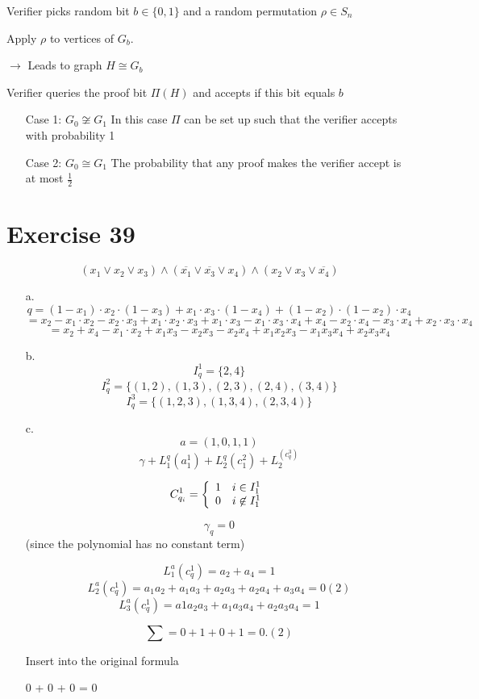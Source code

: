 \documentclass[11pt]{article}
\theoremstyle{definition}
\theoremstyle{definition}
\begin{document}
Verifier picks random bit $ b \in \{0, 1\} $ and a random permutation $ \rho \in S_n $ \newline

Apply $ \rho $ to vertices of $ G_b $.

$ \rightarrow $ Leads to graph $ H \cong G_b $

Verifier queries the proof bit $ \Pi(H) $ and accepts if this bit equals $ b $

\begin{enumerate}
\item[Case 1:] $ G_0 \not \cong G_1 $ \newline
	In this case $ \Pi $ can be set up such that the verifier accepts with probability 1
\item[Case 2:] $ G_0 \cong G_1 $ \newline
	The probability that any proof makes the verifier accept is at most $ \frac{1}{2} $
\end{enumerate}

\section*{Exercise 39}

\[ (x_1 \vee x_2 \vee x_3) \wedge (\overline{x_1} \vee \overline{x_3} \vee x_4) \wedge (x_2 \vee x_3 \vee \overline{x_4}) \]

\begin{enumerate}
\item[a.] \[ q = (1 - x_1) \cdot x_2 \cdot (1 - x_3) + x_1 \cdot x_3 \cdot (1 - x_4) + (1 - x_2) \cdot (1 - x_2) \cdot x_4 \]
	\[ = x_2 - x_1 \cdot x_2 - x_2 \cdot x_3 + x_1  \cdot x_2 \cdot x_3 + x_1 \cdot x_3 - x_1 \cdot x_3 \cdot x_4 + x_4 - x_2 \cdot x_4 - x_3 \cdot x_4 + x_2 \cdot x_3 \cdot x_4\]
	\[ = x_2 + x_4 - x_1 \cdot x_2 + x_1 x_3 - x_2 x_3 - x_2 x_4 + x_1 x_2 x_3 - x_1 x_3 x_4 + x_2 x_3 x_4 \]
\item[b.] \[ I_q^1 = \{2, 4\} \]
 \[ I_q^2 = \{(1,2), (1, 3), (2, 3), (2, 4), (3, 4)\} \]
  \[ I_q^3 = \{(1, 2, 3), (1, 3, 4), (2, 3, 4)\} \]
\item[c.] \[ a = (1, 0, 1, 1) \]
	\[ \gamma + L_1^q(a_1^1) + L_2^q(c_1^2) + L_2^(c_q^3) \]
	
	\[ C_{q_i}^1 = \left\{ \begin{array}{c l}1 & i \in I_1^1 \\ 0 & i \not \in I_1^1 \end{array} \right. \]
	
	\[ \gamma_q = 0 \]
	(since the polynomial has no constant term)
	
	\[ L_1^a (c_q^1) = a_2 + a_4 = 1 \]
	\[ L_2^a (c_q^1) = a_1 a_2 + a_1 a_3 + a_2 a_3 + a_2 a_4 + a_3 a_4 = 0 (2) \]
	\[ L_3^a (c_q^1) = a1 a_2 a_3 + a_1 a_3 a_4 + a_2 a_3 a_4 = 1 \]
	
	\[ \sum = 0 + 1 + 0 + 1 = 0. (2) \]
	
	Insert into the original formula
	
	0 + 0 + 0 = 0

\end{enumerate}
\end{document}

